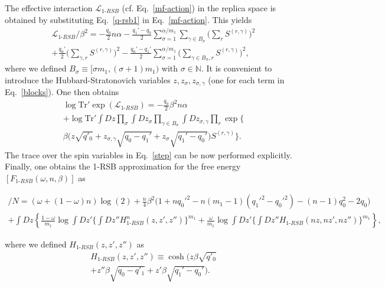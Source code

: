 \documentclass[twocolumn,superscriptaddress,prb,10pt]{revtex4-1}
\def\tr{\textrm{Tr}}
\begin{document}
The effective interaction ${\mathcal L}_{1\textrm{-}RSB}$ (cf. Eq.~\eqref{mf-action}) 
in the replica space is obtained by substituting Eq.~\eqref{q-rsb1} in Eq.~\eqref{mf-action}. 
This yields  
%
\begin{multline}
{\mathcal L}_{1\textrm{-}RSB}/\beta^2=-\frac{q_0}{2}n\alpha
-\frac{q_1'-q_0}{2}\sum\limits_{\sigma=1}^{\alpha/m_1}
\sum\limits_{\gamma\in B_\sigma}\Big(\sum_r S^{(r,\gamma)}\Big)^2\\
+\frac{q_0'}{2}\Big(\sum\limits_{\gamma,r}
S^{(r,\gamma)}\Big)^2-
\frac{q_0'-q_1'}{2}\sum\limits_{\sigma=1}^{\alpha/m_1}
\Big(\sum\limits_{\gamma\in B_\sigma,r}S^{(r,\gamma)}\Big)^2,
\label{blocks}
\end{multline}
%
where we defined $B_\sigma\equiv[\sigma m_1,(\sigma+1)m_1)$ with $\sigma\in\mathbb{N}$. 
It is convenient to introduce the Hubbard-Stratonovich variables $z,z_\sigma,z_{\sigma,\gamma}$ 
(one for each term in Eq.~\eqref{blocks}). One then obtains 
%
\begin{multline}
\label{step}
\log\tr'\exp({\mathcal L}_{1\textrm{-}RSB})=
-\frac{q_0}{2}\beta^2 n\alpha\\
+\log\tr'\int Dz\prod_\sigma\int Dz_\sigma\prod\limits_{\gamma\in B_\sigma}
\int Dz_{\sigma,\gamma}\prod_r\exp\Big\{\\
\beta\Big(z\sqrt{q'_0}+z_{\sigma,\gamma}\sqrt{q_0-q_1'}+
z_{\sigma}\sqrt{q_1'-q_0'}\Big)S^{(r,\gamma)}\Big\}.
\end{multline}
%
The trace over the spin variables in Eq.~\eqref{step} can be now performed explicitly. 
Finally, one obtains the 1-RSB approximation for the free energy 
$[F_{1\textrm{-}RSB}(\omega,n,\beta)]$ as 
%
\begin{widetext}
\begin{multline}
[F_{1\textrm{-}RSB}(\omega,n\beta)]/N=
(\omega+(1-\omega)n)\log(2)+
\frac{n}{4}\beta^2\Big(1+nq_0'^2
-n(m_1-1)(q_1'^2-q_0'^2)-
(n-1)q_0^2-2q_0\Big)\\
+\int Dz\left\{\frac{1-\omega}{m_1}\log\int Dz'\Big\{\int Dz''
H_{1\textrm{-}RSB}^n(z,z',z'')\Big\}^{m_1}
+\frac{\omega}{m_1}
\log\int Dz'\Big\{\int Dz''
H_{1\textrm{-}RSB}(nz,nz',nz'')\Big\}^{m_1}
\right\}, 
\label{RSB-1-logZ}
\end{multline}
\end{widetext}
%
where we defined $H_{1\textrm{-}RSB}(z,z',z'')$ as 
%
\begin{multline}
H_{1\textrm{-}RSB}(z,z',z'')\equiv\cosh(z\beta\sqrt{q'_0}\\+
z''\beta\sqrt{q_0-q'_1} +z'\beta\sqrt{q_1'-q_0'}).
\label{H1}
\end{multline}
\end{document}
